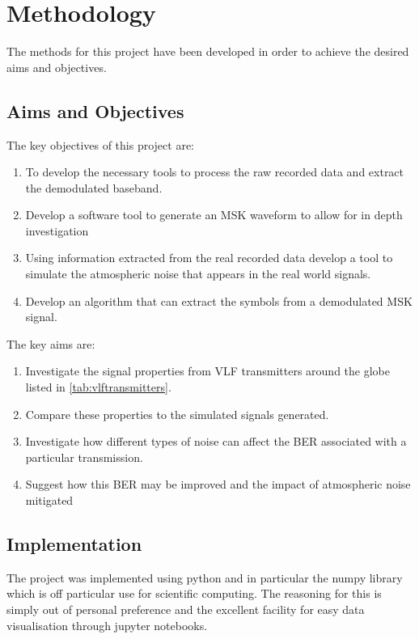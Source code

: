 \chapter{Methodology}
The methods for this project have been developed in order to achieve the desired aims and objectives.

\section{Aims and Objectives}

The key objectives of this project are:

\begin{enumerate}
    \item To develop the necessary tools to process the raw recorded data and extract the demodulated baseband.
    \item Develop a software tool to generate an MSK waveform to allow for in depth investigation
    \item Using information extracted from the real recorded data develop a tool to simulate the atmospheric noise that appears in the real world signals.
    \item Develop an algorithm that can extract the symbols from a demodulated MSK signal.
\end{enumerate}

The key aims are:

\begin{enumerate}
    \item Investigate the signal properties from VLF transmitters around the globe listed in \ref{tab:vlftransmitters}. 
    \item Compare these properties to the simulated signals generated.
    \item Investigate how different types of noise can affect the BER associated with a particular transmission.
    \item Suggest how this BER may be improved and the impact of atmospheric noise mitigated
\end{enumerate}

\section{Implementation}
The project was implemented using python and in particular the numpy library which is off particular use for scientific computing. The reasoning for this is simply out of personal preference and the excellent facility for easy data visualisation through jupyter notebooks. 

